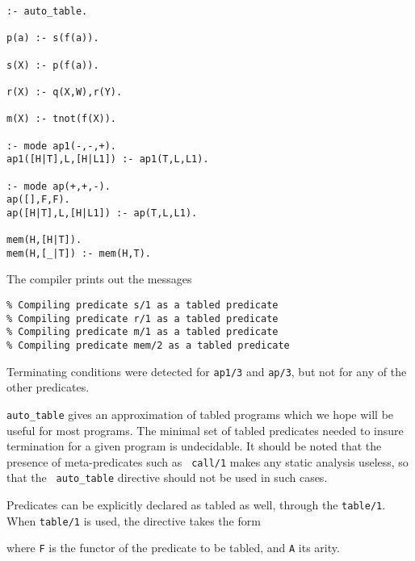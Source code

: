 \begin{center}
\begin{verbatim}
:- auto_table. 

p(a) :- s(f(a)). 

s(X) :- p(f(a)).

r(X) :- q(X,W),r(Y).

m(X) :- tnot(f(X)).

:- mode ap1(-,-,+).
ap1([H|T],L,[H|L1]) :- ap1(T,L,L1).

:- mode ap(+,+,-).
ap([],F,F).
ap([H|T],L,[H|L1]) :- ap(T,L,L1).

mem(H,[H|T]).
mem(H,[_|T]) :- mem(H,T).
\end{verbatim}
\end{center}

\noindent
The compiler prints out the messages
\begin{verbatim}
% Compiling predicate s/1 as a tabled predicate
% Compiling predicate r/1 as a tabled predicate
% Compiling predicate m/1 as a tabled predicate
% Compiling predicate mem/2 as a tabled predicate
\end{verbatim}

Terminating conditions were detected for {\tt ap1/3} and {\tt ap/3}, but
not for any of the other predicates.

{\tt auto\_table} gives an approximation of tabled programs which we
hope will be useful for most programs.  The minimal set of tabled
predicates needed to insure termination for a given program is
undecidable.  
It should be noted that the presence of meta-predicates such as {\tt
call/1} makes any static analysis useless, so that the {\tt
auto\_table} directive should not be used in such cases.

Predicates can be explicitly declared as tabled as well, through the
{\tt table/1}.  When {\tt table/1} is used, the directive takes the
form


\noindent
where {\tt F} is the functor of the predicate to be tabled, and {\tt A} its
arity.  

